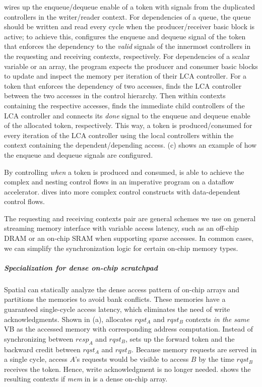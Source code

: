 \name wires up the enqueue/dequeue enable of a token with signals from the duplicated controllers 
in the writer/reader context.
For dependencies of a queue, 
the queue should be written and read every cycle when the producer/receiver basic block is active; 
to achieve this, \name configures the enqueue and dequeue signal of the token that enforces the dependency to the \emph{valid} signals of the innermost controllers in the requesting and receiving
contexts, respectively.
For dependencies of a scalar variable or an array, the program expects the producer and consumer basic blocks to update and inspect the memory per iteration of their LCA controller.
For a token that enforces the dependency of two accesses, 
\name finds the LCA controller between the two accesses in the control hierarchy.
Then within contexts containing the respective accesses, \name finds the immediate child controllers
of the LCA controller and connects its \emph{done} signal to the enqueue and dequeue enable of the allocated
token, respectively.
This way, a token is produced/consumed for every iteration of the LCA controller using the local
controllers within the context containing the dependent/depending access.
 (c) shows an example of how the enqueue and dequeue signals are configured.

By controlling \emph{when} a token is produced and consumed, \name is able to achieve the complex
and nesting control flows in an imperative program on a dataflow accelerator.
 dives into more complex control constructs with 
data-dependent control flows.

The requesting and receiving contexts pair are general schemes we use on general streaming memory
interface with variable access latency, such as an off-chip DRAM or an on-chip SRAM when supporting 
sparse accesses.
In common cases, we can simplify the synchronization logic for certain on-chip memory types.

\subparagraph{Specialization for dense on-chip scratchpad}
Spatial can statically analyze the dense access pattern of on-chip arrays and partitions the memories
to avoid bank conflicts. These memories have a guaranteed single-cycle access latency, 
which eliminates the need of write acknowledgments.
Shown in  (a),
\name allocates $rqst_A$ and $rqst_B$ contexts \emph{in the same} VB as the accessed memory with
corresponding address computation.
Instead of synchronizing between $resp_A$ and $rqst_B$, \name sets up the forward token and the
backward credit between $rqst_A$ and $rqst_B$.
Because memory requests are served in a single cycle, access $A$'s requests would be visible to
access $B$ by the time $rqst_B$ receives the token. Hence, write acknowledgment is no longer needed.
 shows the resulting contexts if \emph{mem} in  is a dense
on-chip array.

